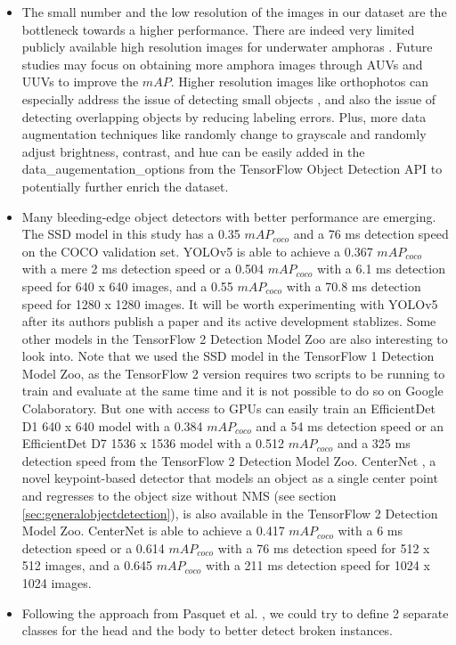 \documentclass[a4paper, 11pt, oneside]{article}
\begin{document}
  \begin{itemize}
    \item The small number and the low resolution of the images in our dataset are the bottleneck towards a higher
    performance. There are indeed very limited publicly available high resolution images for underwater amphoras
    \cite{pasquet2017amphora}. Future studies may focus on obtaining more amphora images through AUVs and UUVs to improve
    the $mAP$. Higher resolution images like orthophotos can especially address the issue of detecting
    small objects \cite{kisantal2019augmentation}, and also the issue of detecting overlapping objects by reducing labeling
    errors. Plus, more data augmentation techniques like randomly change to grayscale and randomly adjust brightness,
    contrast, and hue can be easily added in the data\_augementation\_options from the TensorFlow Object Detection API
    to potentially further enrich the dataset.
    \item Many bleeding-edge object detectors with better performance are emerging. The SSD model in this study
    has a 0.35 $mAP_{coco}$ and a 76 ms detection speed on the COCO validation set. YOLOv5 is able to achieve a 0.367
    $mAP_{coco}$ with a mere 2 ms detection speed or a 0.504 $mAP_{coco}$ with a 6.1 ms detection speed for 640 x 640 images,
    and a 0.55 $mAP_{coco}$ with a 70.8 ms detection speed for 1280 x 1280 images. It will be worth experimenting with
    YOLOv5 after its authors publish a paper and its active development stablizes. Some other models in the TensorFlow 2
    Detection Model Zoo \cite{tf2detectionmodelzoo} are also interesting to look into. Note that we used the SSD
    model in the TensorFlow 1 Detection Model Zoo, as the TensorFlow 2 version requires two scripts to be running
    to train and evaluate at the same time and it is not possible to do so on Google Colaboratory. But one with access to
    GPUs can easily train an EfficientDet \cite{tan2020efficientdet} D1 640 x 640 model with a 0.384 $mAP_{coco}$ and a
    54 ms detection speed or an EfficientDet D7 1536 x 1536 model with a 0.512 $mAP_{coco}$ and a 325 ms detection speed
    from the TensorFlow 2 Detection Model Zoo. CenterNet \cite{zhou2019objects}, a novel keypoint-based detector that
    models an object as a single center point and regresses to the object size without NMS
    (see section \ref{sec:generalobjectdetection}), is also available in the TensorFlow 2 Detection Model Zoo. CenterNet
    is able to achieve a 0.417 $mAP_{coco}$ with a 6 ms detection speed or a 0.614 $mAP_{coco}$ with a 76 ms detection
    speed for 512 x 512 images, and a 0.645 $mAP_{coco}$ with a 211 ms detection speed for 1024 x 1024 images.
    \item Following the approach from Pasquet et al. \cite{pasquet2017amphora}, we could try to define 2 separate classes
    for the head and the body to better detect broken instances.
  \end{itemize}

  \newpage

  \printbibliography
\end{document}
